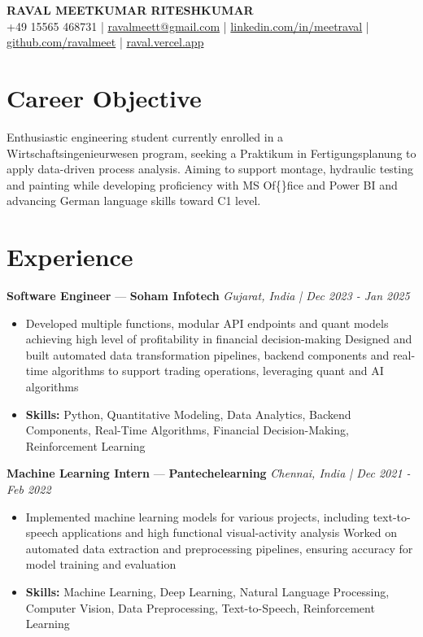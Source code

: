\documentclass[a4paper,10pt]{article}
\begin{document}
\begin{center}
  {\Large\bfseries RAVAL MEETKUMAR RITESHKUMAR}\\[2pt]
  {\small +49 15565 468731 \;|\; \href{mailto:ravalmeett@gmail.com}{ravalmeett@gmail.com} \;|\; \href{https://www.linkedin.com/in/meetraval/}{linkedin.com/in/meetraval} \;|\; \href{https://github.com/ravalmeet}{github.com/ravalmeet} \;|\; \href{https://raval.vercel.app/}{raval.vercel.app}}
\end{center}
\vspace{-3pt}

\section*{Career Objective}
Enthusiastic engineering student currently enrolled in a Wirtschaftsingenieurwesen program, seeking a Praktikum in Fertigungsplanung to apply data-driven process analysis. Aiming to support montage, hydraulic testing and painting while developing proficiency with MS Of\{\}fice and Power BI and advancing German language skills toward C1 level.\par

\section*{Experience}
\textbf{Software Engineer} — \textbf{Soham Infotech} \hfill \textit{Gujarat, India \;|\; Dec 2023 - Jan 2025}\par
\vspace{1pt}
\begin{itemize}
  \item Developed multiple functions, modular API endpoints and quant models achieving high level of profitability in financial decision-making Designed and built automated data transformation pipelines, backend components and real-time algorithms to support trading operations, leveraging quant and AI algorithms
  \item \textbf{Skills:} Python, Quantitative Modeling, Data Analytics, Backend Components, Real-Time Algorithms, Financial Decision-Making, Reinforcement Learning
\end{itemize}
\vspace{3pt}
\textbf{Machine Learning Intern} — \textbf{Pantechelearning} \hfill \textit{Chennai, India \;|\; Dec 2021 - Feb 2022}\par
\vspace{1pt}
\begin{itemize}
  \item Implemented machine learning models for various projects, including text-to-speech applications and high functional visual-activity analysis Worked on automated data extraction and preprocessing pipelines, ensuring accuracy for model training and evaluation
  \item \textbf{Skills:} Machine Learning, Deep Learning, Natural Language Processing, Computer Vision, Data Preprocessing, Text-to-Speech, Reinforcement Learning
\end{itemize}
\end{document}
